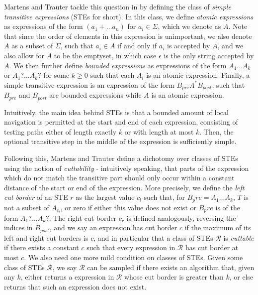 \documentclass{article}
\begin{document}
Martens and Trauter tackle this question in \cite{martensEvaluationEnumerationProblems2018} by defining the class of \emph{simple transitive expressions} (STEs for short). In this class, we define \emph{atomic expressions} as expressions of the form $(a_1 + \dots a_n)$ for $a_i \in \Sigma$, which we denote as $A$. Note that since the order of elements in this expression is unimportant, we also denote $A$ as a subset of $\Sigma$, such that $a_i \in A$ if and only if $a_i$ is accepted by $A$, and we also allow for $A$ to be the emptyset, in which case $\epsilon$ is the only string accepted by $A$. We then further define \emph{bounded expressions} as expressions of the form $A_1 \dots A_k$ or $A_1 ? \dots A_k ?$ for some $k \geq 0$ such that each $A_i$ is an atomic expression. Finally, a simple transitive expression is an expression of the form $B_{pre}A^* B_{post}$, such that $B_{pre}$ and $B_{post}$ are bounded expressions while $A$ is an atomic expression.

Intuitively, the main idea behind STEs is that a bounded amount of local navigation is permitted at the start and end of each expression, consisting of testing paths either of length exactly $k$ or with length at most $k$. Then, the optional transitive step in the middle of the expression is sufficiently simple.

Following this, Martens and Trauter define a dichotomy over classes of STEs using the notion of \emph{cuttability} - intuitively speaking, that parts of the expression which do not match the transitive part should only occur within a constant distance of the start or end of the expression. More precisely, we define the \emph{left cut border} of an STE $r$ as the largest value $c_l$ such that, for $B_pre = A_1 \dots A_k$, $T$ is not a subset of $A_{c_l}$, or zero if either this value does not exist or $B_pre$ is of the form $A_1 ? \dots A_k ?$. The right cut border $c_r$ is defined analogously, reversing the indices in $B_{post}$, and we say an expression has cut border $c$ if the maximum of its left and right cut borders is $c$, and in particular that a class of STEs $\mathcal{R}$ is \emph{cuttable} if there exists a constant $c$ such that every expression in $\mathcal{R}$ has cut border at most $c$. We also need one more mild condition on classes of STEs. Given some class of STEs $\mathcal{R}$, we say $\mathcal{R}$ can be sampled if there exists an algorithm that, given any $k$, either returns a expression in $\mathcal{R}$ whose cut border is greater than $k$, or else returns that such an expression does not exist.
\end{document}
